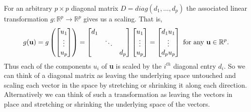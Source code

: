 \documentclass{book}
\begin{document}
For an arbitrary $p \times p$ diagonal matrix $D=diag(d_1,\ldots,d_p)$ the associated linear transformation $g:\mathbb{R}^p\rightarrow \mathbb{R}^p$ gives us a scaling. That is,  
$$
g({\bf u})=
g\left(
\begin{bmatrix}
u_1\\
\vdots\\
u_p
\end{bmatrix}
\right)=
\begin{bmatrix}
d_1& & \\
& \ddots& \\
& & d_p\\
\end{bmatrix}
\begin{bmatrix}
u_1\\
\vdots\\
u_p
\end{bmatrix}
=
\begin{bmatrix}
d_1 u_1\\
\vdots\\
d_p u_p
\end{bmatrix}\text{ for any } {\bf u}\in \mathbb{R}^p.
$$ Thus each of the components $u_i$ of {\bf u} is scaled by the $i^{th}$ diagonal entry $d_i$.  So we can think of a diagonal matrix as leaving the underlying space untouched and scaling each vector in the space by stretching or shrinking it along each direction. Alternatively we can think of such a transformation as leaving the vectors in place and stretching or shrinking the underlying space of the vectors. 
\end{document}
